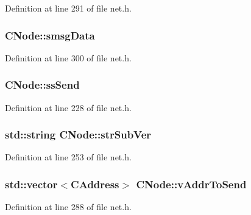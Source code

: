Definition at line 291 of file net.\+h.

\hypertarget{class_c_node_a739eeb371b83583a159b0b9d386737b9}{}
\subsubsection[{smsg\+Data}]{ C\+Node\+::smsg\+Data}\label{class_c_node_a739eeb371b83583a159b0b9d386737b9}


Definition at line 300 of file net.\+h.

\hypertarget{class_c_node_a6174b5a3d8d8f6a2daf02be3cf04dc63}{}
\subsubsection[{ss\+Send}]{ C\+Node\+::ss\+Send}\label{class_c_node_a6174b5a3d8d8f6a2daf02be3cf04dc63}


Definition at line 228 of file net.\+h.

\hypertarget{class_c_node_afb24fb33019af5c4085412fe3898cf01}{}
\subsubsection[{str\+Sub\+Ver}]{\setlength{\rightskip}{0pt plus 5cm}std\+::string C\+Node\+::str\+Sub\+Ver}\label{class_c_node_afb24fb33019af5c4085412fe3898cf01}


Definition at line 253 of file net.\+h.

\hypertarget{class_c_node_a9b2d9b9182ff111c79f704594c4aa2e1}{}
\subsubsection[{v\+Addr\+To\+Send}]{\setlength{\rightskip}{0pt plus 5cm}std\+::vector$<${\bf C\+Address}$>$ C\+Node\+::v\+Addr\+To\+Send}\label{class_c_node_a9b2d9b9182ff111c79f704594c4aa2e1}


Definition at line 288 of file net.\+h.

\hypertarget{class_c_node_a212cf268fdb1903f61993319175f023e}{}
